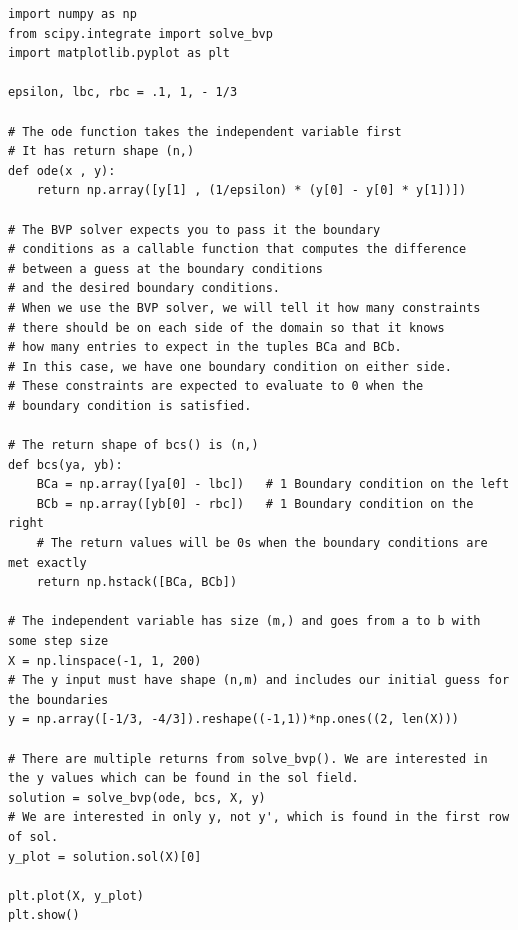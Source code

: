 \begin{lstlisting}
import numpy as np
from scipy.integrate import solve_bvp
import matplotlib.pyplot as plt

epsilon, lbc, rbc = .1, 1, - 1/3

# The ode function takes the independent variable first
# It has return shape (n,)
def ode(x , y):
    return np.array([y[1] , (1/epsilon) * (y[0] - y[0] * y[1])])

# The BVP solver expects you to pass it the boundary
# conditions as a callable function that computes the difference
# between a guess at the boundary conditions
# and the desired boundary conditions.
# When we use the BVP solver, we will tell it how many constraints
# there should be on each side of the domain so that it knows
# how many entries to expect in the tuples BCa and BCb.
# In this case, we have one boundary condition on either side.
# These constraints are expected to evaluate to 0 when the
# boundary condition is satisfied.

# The return shape of bcs() is (n,)
def bcs(ya, yb):
    BCa = np.array([ya[0] - lbc])   # 1 Boundary condition on the left
    BCb = np.array([yb[0] - rbc])   # 1 Boundary condition on the right
    # The return values will be 0s when the boundary conditions are met exactly
    return np.hstack([BCa, BCb])

# The independent variable has size (m,) and goes from a to b with some step size
X = np.linspace(-1, 1, 200)
# The y input must have shape (n,m) and includes our initial guess for the boundaries
y = np.array([-1/3, -4/3]).reshape((-1,1))*np.ones((2, len(X)))

# There are multiple returns from solve_bvp(). We are interested in the y values which can be found in the sol field.
solution = solve_bvp(ode, bcs, X, y)
# We are interested in only y, not y', which is found in the first row of sol.
y_plot = solution.sol(X)[0]

plt.plot(X, y_plot)
plt.show()
\end{lstlisting}

